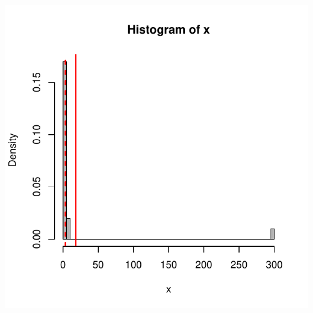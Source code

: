 \documentclass{beamer}\usepackage[]{graphicx}\usepackage[]{color}
\newenvironment{knitrout}{}{} %
\renewenvironment{knitrout}{\setlength{\topsep}{0mm}}{}
\begin{document}
\begin{frame}[fragile]
\begin{columns}[c]
\centering
\begin{knitrout}
\color{fgcolor}
\includegraphics[width=1.1\linewidth]{figure/unnamed-chunk-19-1} 

\end{knitrout}

\end{columns}

\end{frame} 
\end{document}

